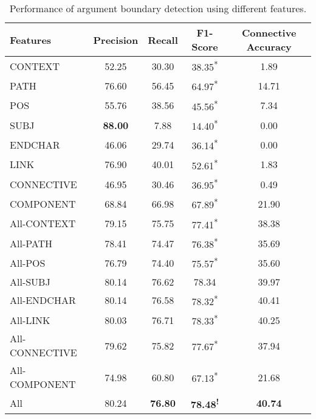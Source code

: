 \begin{table}[!htbp]
\centering
\begin{tabular}{|l|c|c|c|c|}
\hline

    Features        &     Precision &     Recall &     F1-Score                 &     Connective Accuracy \\ \hline
    CONTEXT         &     52.25     &     30.30  &     38.35\textsuperscript{*} &      1.89               \\ \hline
    PATH            &     76.60     &     56.45  &     64.97\textsuperscript{*} &     14.71               \\ \hline
    POS             &     55.76     &     38.56  &     45.56\textsuperscript{*} &      7.34               \\ \hline
    SUBJ            & \bf 88.00     &      7.88  &     14.40\textsuperscript{*} &      0.00               \\ \hline
    ENDCHAR         &     46.06     &     29.74  &     36.14\textsuperscript{*} &      0.00               \\ \hline
    LINK            &     76.90     &     40.01  &     52.61\textsuperscript{*} &      1.83               \\ \hline
    CONNECTIVE      &     46.95     &     30.46  &     36.95\textsuperscript{*} &      0.49               \\ \hline
    COMPONENT       &     68.84     &     66.98  &     67.89\textsuperscript{*} &     21.90               \\ \hline
    All-CONTEXT     &     79.15     &     75.75  &     77.41\textsuperscript{*} &     38.38               \\ \hline
    All-PATH        &     78.41     &     74.47  &     76.38\textsuperscript{*} &     35.69               \\ \hline
    All-POS         &     76.79     &     74.40  &     75.57\textsuperscript{*} &     35.60               \\ \hline
    All-SUBJ        &     80.14     &     76.62  &     78.34\textsuperscript{ } &     39.97               \\ \hline
    All-ENDCHAR     &     80.14     &     76.58  &     78.32\textsuperscript{*} &     40.41               \\ \hline
    All-LINK        &     80.03     &     76.71  &     78.33\textsuperscript{*} &     40.25               \\ \hline
    All-CONNECTIVE  &     79.62     &     75.82  &     77.67\textsuperscript{*} &     37.94               \\ \hline
    All-COMPONENT   &     74.98     &     60.80  &     67.13\textsuperscript{*} &     21.68               \\ \hline
    All             &     80.24     & \bf 76.80  & \bf 78.48\textsuperscript{!} & \bf 40.74               \\ \hline

\end{tabular}
\caption{\label{t:argument-features} Performance of argument boundary detection
using different features. }
\end{table}
